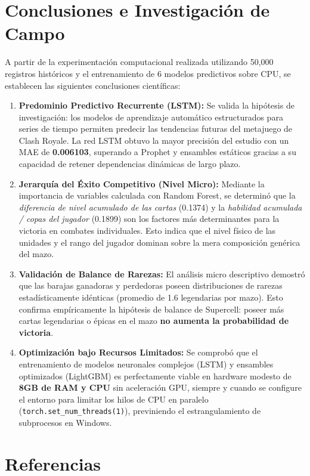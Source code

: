 \documentclass[
  spanish,
  12pt,
]{report}
\providecommand{\tightlist}{%
  \setlength{\itemsep}{0pt}\setlength{\parskip}{0pt}}
\begin{document}
\chapter{Conclusiones e Investigación de
Campo}\label{conclusiones-e-investigaciuxf3n-de-campo}

A partir de la experimentación computacional realizada utilizando 50,000
registros históricos y el entrenamiento de 6 modelos predictivos sobre
CPU, se establecen las siguientes conclusiones científicas:

\begin{enumerate}
\def\labelenumi{\arabic{enumi}.}
\tightlist
\item
  \textbf{Predominio Predictivo Recurrente (LSTM):} Se valida la
  hipótesis de investigación: los modelos de aprendizaje automático
  estructurados para series de tiempo permiten predecir las tendencias
  futuras del metajuego de Clash Royale. La red LSTM obtuvo la mayor
  precisión del estudio con un MAE de \textbf{0.006103}, superando a
  Prophet y ensambles estáticos gracias a su capacidad de retener
  dependencias dinámicas de largo plazo.
\item
  \textbf{Jerarquía del Éxito Competitivo (Nivel Micro):} Mediante la
  importancia de variables calculada con Random Forest, se determinó que
  la \emph{diferencia de nivel acumulado de las cartas} (0.1374) y la
  \emph{habilidad acumulada / copas del jugador} (0.1899) son los
  factores más determinantes para la victoria en combates individuales.
  Esto indica que el nivel físico de las unidades y el rango del jugador
  dominan sobre la mera composición genérica del mazo.
\item
  \textbf{Validación de Balance de Rarezas:} El análisis micro
  descriptivo demostró que las barajas ganadoras y perdedoras poseen
  distribuciones de rarezas estadísticamente idénticas (promedio de 1.6
  legendarias por mazo). Esto confirma empíricamente la hipótesis de
  balance de Supercell: poseer más cartas legendarias o épicas en el
  mazo \textbf{no aumenta la probabilidad de victoria}.
\item
  \textbf{Optimización bajo Recursos Limitados:} Se comprobó que el
  entrenamiento de modelos neuronales complejos (LSTM) y ensambles
  optimizados (LightGBM) es perfectamente viable en hardware modesto de
  \textbf{8GB de RAM y CPU} sin aceleración GPU, siempre y cuando se
  configure el entorno para limitar los hilos de CPU en paralelo
  (\texttt{torch.set\_num\_threads(1)}), previniendo el estrangulamiento
  de subprocesos en Windows.
\end{enumerate}

\chapter{Referencias}\label{referencias}

\protect{}\label{refs}
\end{document}
